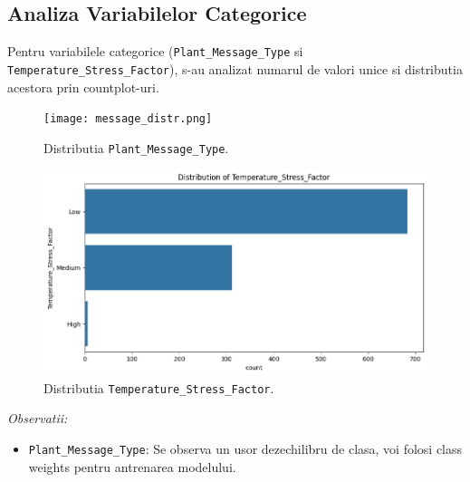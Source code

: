 \documentclass[11pt, a4paper]{article}
\begin{document}
\subsection{Analiza Variabilelor Categorice}
Pentru variabilele categorice (\texttt{Plant\_Message\_Type} si \texttt{Temperature\_Stress\_Factor}), s-au analizat numarul de valori unice si distributia acestora prin countplot-uri.

\begin{figure}[H]
    \centering
    \texttt{[image: message\_distr.png]}
    \caption{Distributia \texttt{Plant\_Message\_Type}.}
    \label{fig:countplot_message}
\end{figure}

\begin{figure}[H]
    \centering
    \includegraphics[width=\linewidth]{stress_distr.png}
    \caption{Distributia \texttt{Temperature\_Stress\_Factor}.}
    \label{fig:countplot_stress}
\end{figure}


\textit{Observatii:}
\begin{itemize}[noitemsep, topsep=1pt]
    \item \texttt{Plant\_Message\_Type}: Se observa un usor dezechilibru de clasa, voi folosi class weights pentru antrenarea modelului.
\end{itemize}
\end{document}
